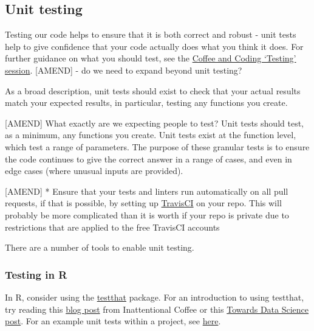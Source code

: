 \documentclass[]{book}
\begin{document}
\hypertarget{unittest}{%
\subsection{Unit testing}\label{unittest}}

Testing our code helps to ensure that it is both correct and robust - unit tests help to give confidence that your code actually does what you think it does. For further guidance on what you should test, see the \href{https://github.com/moj-analytical-services/coffee-and-coding-public/tree/master/2019-12-06\%20Testing\%20as\%20part\%20of\%20an\%20Analytical\%20Project}{Coffee and Coding `Testing' session}. {[}AMEND{]} - do we need to expand beyond unit testing?

As a broad description, unit tests should exist to check that your actual results match your expected results, in particular, testing any functions you create.

{[}AMEND{]} What exactly are we expecting people to test?
Unit tests should test, as a minimum, any functions you create. Unit tests exist at the function level, which test a range of parameters. The purpose of these granular tests is to ensure the code continues to give the correct answer in a range of cases, and even in edge cases (where unusual inputs are provided).

{[}AMEND{]}
* Ensure that your tests and linters run automatically on all pull requests, if that is possible, by setting up \href{https://travis-ci.org/}{TravisCI} on your repo. This will probably be more complicated than it is worth if your repo is private due to restrictions that are applied to the free TravisCI accounts

There are a number of tools to enable unit testing.

\hypertarget{testing-in-r}{%
\subsubsection*{Testing in R}\label{testing-in-r}}

In R, consider using the \href{https://github.com/r-lib/testthat}{testthat} package. For an introduction to using testthat, try reading this \href{https://katherinemwood.github.io/post/testthat/}{blog post} from Inattentional Coffee or this \href{https://towardsdatascience.com/unit-testing-in-r-68ab9cc8d211}{Towards Data Science post}. For an example unit tests within a project, see \href{https://github.com/RobinL/costmodelr/tree/master/tests}{here}.
\end{document}
